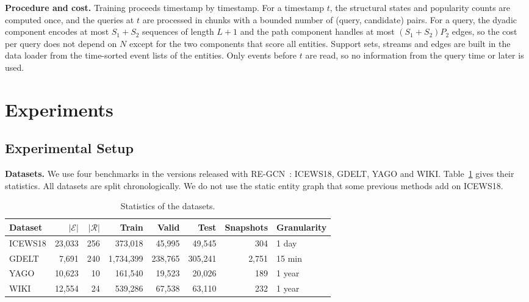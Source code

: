 \documentclass[runningheads]{llncs}
\newcommand{\para}[1]{\smallskip\noindent\textbf{#1}}
\begin{document}
\para{Procedure and cost.} Training proceeds timestamp by timestamp. For a timestamp $t$, the structural states and popularity counts are computed once, and the queries at $t$ are processed in chunks with a bounded number of (query, candidate) pairs. For a query, the dyadic component encodes at most $S_1 + S_2$ sequences of length $L + 1$ and the path component handles at most $(S_1 + S_2) P_2$ edges, so the cost per query does not depend on $N$ except for the two components that score all entities. Support sets, streams and edges are built in the data loader from the time-sorted event lists of the entities. Only events before $t$ are read, so no information from the query time or later is used.

\section{Experiments}
\label{sec:exp}

\subsection{Experimental Setup}
\label{sec:setup}

\para{Datasets.} We use four benchmarks in the versions released with RE-GCN~\cite{li2021regcn}: ICEWS18, GDELT, YAGO and WIKI. Table~\ref{tab:data} gives their statistics. All datasets are split chronologically. We do not use the static entity graph that some previous methods add on ICEWS18.

\begin{table}[t]
  \centering
  \caption{Statistics of the datasets.}
  \label{tab:data}
  \setlength{\tabcolsep}{5pt}
  \begin{tabular}{l rrrrrrl}
    \toprule
    Dataset & $|\mathcal{E}|$ & $|\mathcal{R}|$ & Train & Valid & Test & Snapshots & Granularity \\
    \midrule
    ICEWS18 & 23,033 & 256 & 373,018 & 45,995 & 49,545 & 304 & 1 day \\
    GDELT & 7,691 & 240 & 1,734,399 & 238,765 & 305,241 & 2,751 & 15 min \\
    YAGO & 10,623 & 10 & 161,540 & 19,523 & 20,026 & 189 & 1 year \\
    WIKI & 12,554 & 24 & 539,286 & 67,538 & 63,110 & 232 & 1 year \\
    \bottomrule
  \end{tabular}
\end{table}
\end{document}
